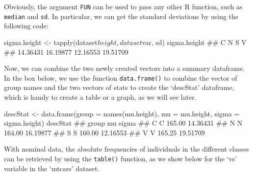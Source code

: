 \documentclass[a4paper,12pt,oneside]{book}
\newenvironment{Shaded}{\begin{snugshade}}{\end{snugshade}}
\newcommand{\SpecialCharTok}[1]{#1}
\newcommand{\DocumentationTok}[1]{#1}
\newcommand{\OtherTok}[1]{#1}
\newcommand{\FunctionTok}[1]{#1}
\newcommand{\AttributeTok}[1]{#1}
\newcommand{\NormalTok}[1]{#1}
\begin{document}
Obviously, the argument \texttt{FUN} can be used to pass any other R function, such as \texttt{median} and \texttt{sd}. In particular, we can get the standard deviations by using the following code:

\begin{Shaded}
\begin{Highlighting}[]
\NormalTok{sigma.height }\OtherTok{\textless{}{-}} \FunctionTok{tapply}\NormalTok{(dataset}\SpecialCharTok{$}\NormalTok{height, dataset}\SpecialCharTok{$}\NormalTok{var, sd)}
\NormalTok{sigma.height}
\DocumentationTok{\#\#        C        N        S        V }
\DocumentationTok{\#\# 14.36431 16.19877 12.16553 19.51709}
\end{Highlighting}
\end{Shaded}

Now, we can combine the two newly created vectors into a summary dataframe. In the box below, we use the function \texttt{data.frame()} to combine the vector of group names and the two vectors of stats to create the `descStat' dataframe, which is handy to create a table or a graph, as we will see later.

\begin{Shaded}
\begin{Highlighting}[]
\NormalTok{descStat }\OtherTok{\textless{}{-}} \FunctionTok{data.frame}\NormalTok{(}\AttributeTok{group =} \FunctionTok{names}\NormalTok{(mu.height),}
                       \AttributeTok{mu =}\NormalTok{ mu.height, }
                       \AttributeTok{sigma =}\NormalTok{ sigma.height)}
\NormalTok{descStat}
\DocumentationTok{\#\#   group     mu    sigma}
\DocumentationTok{\#\# C     C 165.00 14.36431}
\DocumentationTok{\#\# N     N 164.00 16.19877}
\DocumentationTok{\#\# S     S 160.00 12.16553}
\DocumentationTok{\#\# V     V 165.25 19.51709}
\end{Highlighting}
\end{Shaded}

With nominal data, the absolute frequencies of individuals in the different classes can be retrieved by using the \texttt{table()} function, as we show below for the `vs' variable in the `mtcars' dataset.

\begin{Shaded}
\end{Shaded}
\end{document}
